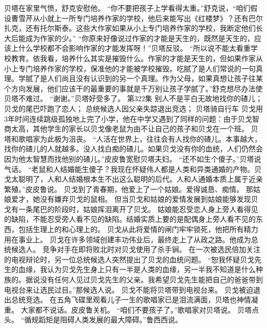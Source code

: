 \documentclass[a4paper,12pt,UTF8,twoside]{ctexbook}
\begin{document}
        贝塔在家里气愤，舒克安慰他。  
        “你不要把孩子上学看得太重。”舒克说，“咱们假设曹雪芹从小就上一所专门培养作家的学校，他后来能写出《红楼梦》？还有巴尔扎克，还有托尔斯泰。这些大作家如果从小上专门培养作家的学校，我断定他们长大后能成为作家的少。”  
        “你原来好像说过作家的才能是天生的，既然是天生的，应该上什么学校都不会影响作家的才能发挥呀！”贝塔反驳。  
        “所以说不能太看重学校教育。依我看，培养什么其实是摧毁什么。作家的才能是天生的，但如果作家从小上专门培养作家的学校，保准他的才能被学校摧毁。吃腻了是人们常说的一句真理。学腻了是人们尚且没有认识到的另一个真理。作为父母，如果真想让孩子往某个方向发展，他们应该干的最重要的事就是千万别让孩子学腻了。”舒克想尽办法使贝塔不难过。  
        “谢谢。”贝塔好受多了。          第322集  
        别人不是平白无故地找你的碴儿；  
        贝戈的尾巴吓跑了恋人；  
        总统候选人因父亲失踪退出竞选；  
        贝塔骑自行车    
        贝戈用3年时间连续跳级孤独地上完了小学，他在中学又遇到了同样的问题：由于贝戈智商太高，其他学生的家长以贝戈像老鼠为由不让自己的孩子和贝戈在一个班。  
        贝塔和歌唱家为此极为沮丧。  
        “人活在世界上，往往会有人找你的碴儿。本事越大，找你的碴儿的人就越多。没人找白痴的碴儿。如果贝戈没有你的血统，人们仍然会因为他太智慧而找他别的碴儿。”皮皮鲁宽慰贝塔夫妇。  
        “还不如生个傻子。”贝塔说气话。  
        “老鼠和人结婚能生傻子？我现在怀疑伟人都是人类和异类通婚的产物。贝戈太聪明了，人和人结婚根本生不出这么聪明的后代。人和人通婚本质上属于近亲繁殖。”皮皮鲁说。  
        贝戈到了青春期，他爱上了一个姑娘。爱得诚恳、痴情。  
        那姑娘爱才，她没有嫌弃贝戈的鼠相。  
        但当贝戈和姑娘的爱情发展到姑娘能够发现贝戈有一条尾巴的阶段时，姑娘挥泪离开了贝戈。  
        姑娘能忍受恋人身上旁人看得见的缺陷，不能忍受旁人看不见的缺陷。结婚实质上要的是配偶身上旁人看不见的东西，包括生理上的和心理上的。  
        贝戈从此将爱情的闸门牢牢锁死，他把所有精力用在事业上。  
        贝戈在许多领域创建丰功伟业后，最终走上了从政之路。他成为总统候选人。  
        竞争对手在即将败北时对贝戈使用了杀手锏。  
        在一次被选民倍加关注的电视辩论时，另一位总统候选人突然提出了贝戈的血统问题。  
        “恕我怀疑贝戈先生的血缘，我认为贝戈先生身上只有一半是人类的血缘，另一半我不知道是什么种族的。据说没有任何人见过贝戈先生的父亲。我希望贝戈先生能把自己的爸爸带到电视台来让选民过目。”那候选人说。  
        贝戈不能将贝塔带到电视台来。        
        贝戈被迫退出总统竞选。  
        在五角飞碟里观看儿子一生的歌唱家已是泪流满面，贝塔也神情凝重。  
        大家都不说话。皮皮鲁关机。  
        “咱们不要孩子了。”歌唱家对贝塔说。  
        贝塔点头。  
        “循规蹈矩是阻碍人类发展的最大障碍。”鲁西西说。  
\end{document}
